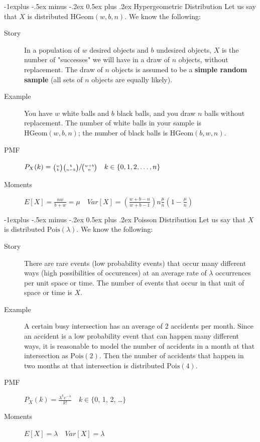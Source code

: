 \documentclass[10pt,landscape]{article}
\makeatletter
\newcommand{\Pois}{\textrm{Pois}}
\newcommand{\Hypergeometric}{\textrm{HGeom}}
\newcommand{\HGeom}{\textrm{HGeom}}
\renewcommand{\subsection}{\@startsection{subsection}{2}{0mm}%
{-1explus -.5ex minus -.2ex}%
{0.5ex plus .2ex}%
{\normalfont\normalsize\bfseries}}
\makeatother
\begin{document}
\begin{multicols*}{3}
        \subsection{Hypergeometric Distribution} Let us say that $X$ is distributed $\Hypergeometric(w, b, n)$. We know the following:
        \begin{description}
            \item[Story] In a population of $w$ desired objects and  $b$ undesired objects, $X$ is the number of "successes" we will have in a draw of $n$ objects, without replacement. The draw of $n$ objects is assumed to be a \textbf{simple random sample} (all sets of $n$ objects are equally likely).
            \item[Example] You have $w$ white balls and $b$ black balls, and you draw $n$ balls without replacement. The number of white balls in your sample is $\HGeom(w,b,n)$; the number of black balls is $\HGeom(b,w,n)$. \item[PMF] $P_X(k) = \sfrac{{w \choose k}{b \choose n-k}}{{w + b \choose n}} \quad k \in \{0, 1, 2, \dots, n\}$
            \item[Moments] $E[X] = \frac{nw}{b+w} = \mu \quad Var[X] = \left(\frac{w+b-n}{w+b-1} \right) n\frac{\mu}{n}(1 - \frac{\mu}{n})$
        \end{description}

        \subsection{Poisson Distribution} Let us say that $X$ is distributed $\Pois(\lambda)$. We know the following:
        \begin{description}
            \item[Story] There are rare events (low probability events) that occur many different ways (high possibilities of occurences) at an average rate of $\lambda$ occurrences per unit space or time. The number of events that occur in that unit of space or time is $X$.

            \item[Example] A certain busy intersection has an average of 2 accidents per month. Since an accident is a low probability event that can happen many different ways, it is reasonable to model the number of accidents in a month at that intersection as $\Pois(2)$. Then the number of accidents that happen in two months at that intersection is distributed $\Pois(4)$.
            \item[PMF] $P_X(k) = \frac{\lambda^ke^{-\lambda}}{k!} \quad k \in \{$0, 1, 2, \dots $\}$
            \item[Moments] $E[X] = \lambda \quad Var[X] = \lambda$


\end{description}
\end{multicols*}
\end{document}
